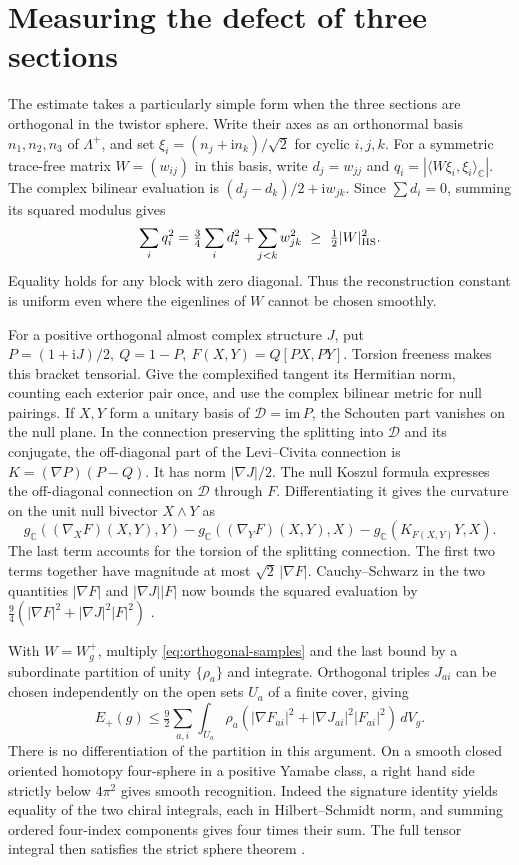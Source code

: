\documentclass[11pt]{article}
\numberwithin{equation}{section}
\begin{document}
\section{Measuring the defect of three sections}\label{sec:three-defects}

The estimate takes a particularly simple form when the three sections
are orthogonal in the twistor sphere. Write their axes as an orthonormal
basis \(n_1,n_2,n_3\) of \(\Lambda^+\), and set
\(\xi_i=(n_j+\mathrm i n_k)/\sqrt2\) for cyclic \(i,j,k\).
For a symmetric trace-free matrix \(W=(w_{ij})\) in this basis, write
\(d_j=w_{jj}\) and \(q_i=|\langle W\xi_i,\xi_i\rangle_{\mathbb C}|\).
The complex bilinear evaluation is \((d_j-d_k)/2+\mathrm i w_{jk}\).
Since \(\sum d_i=0\), summing its squared modulus gives
\begin{equation}\label{eq:orthogonal-samples}
 \sum_i q_i^2=\tfrac34\sum_i d_i^2+\sum_{j<k}w_{jk}^2
 \ \ge\ \tfrac12|W|_{\rm HS}^2 .
\end{equation}
Equality holds for any block with zero diagonal. Thus the reconstruction
constant is uniform even where the eigenlines of \(W\) cannot be chosen
smoothly.

For a positive orthogonal almost complex structure \(J\), put
\(P=(1+\mathrm iJ)/2,\ Q=1-P,\ F(X,Y)=Q[PX,PY]\). Torsion freeness
makes this bracket tensorial. Give the complexified tangent its
Hermitian norm, counting each exterior pair once, and use the complex
bilinear metric for null pairings. If \(X,Y\) form a unitary basis of
\(\mathcal D=\mathrm{im}\,P\), the Schouten part vanishes on the null
plane. In the connection preserving the splitting into \(\mathcal D\)
and its conjugate, the off-diagonal part of the Levi--Civita connection is
\(K=(\nabla P)(P-Q)\). It has norm \(|\nabla J|/2\). The null Koszul
formula expresses the off-diagonal connection on \(\mathcal D\) through
\(F\). Differentiating it gives the curvature on the unit null bivector
\(X\wedge Y\) as
\[
 g_{\mathbb C}((\nabla_X F)(X,Y),Y)
 -g_{\mathbb C}((\nabla_Y F)(X,Y),X)
 -g_{\mathbb C}(K_{F(X,Y)}Y,X).
\]
The last term accounts for the torsion of the splitting connection.
The first two terms together have magnitude at most
\(\sqrt2\,|\nabla F|\). Cauchy--Schwarz in the two quantities
\(|\nabla F|\) and \(|\nabla J||F|\) now bounds the squared evaluation
by \(\tfrac94(|\nabla F|^2+|\nabla J|^2|F|^2)\)
\cite{Baker2026TwistorSections}.

With \(W=W_g^+\), multiply \eqref{eq:orthogonal-samples} and the
last bound by a subordinate partition of unity \(\{\rho_a\}\) and
integrate. Orthogonal triples \(J_{ai}\) can be chosen independently
on the open sets \(U_a\) of a finite cover, giving
\[
 E_+(g)\le\tfrac92\sum_{a,i}\int_{U_a}\rho_a
  (|\nabla F_{ai}|^2+|\nabla J_{ai}|^2|F_{ai}|^2)\,dV_g .
\]
There is no differentiation of the partition in this argument. On a
smooth closed oriented homotopy four-sphere in a positive Yamabe class,
a right hand side strictly below \(4\pi^2\) gives smooth recognition.
Indeed the signature identity yields equality of the two chiral
integrals, each in Hilbert--Schmidt norm, and summing ordered
four-index components gives four times their sum. The full tensor
integral then satisfies the strict sphere theorem
\cite[Theorem~A and Remark~2]{ChangGurskyYang2003}.
\end{document}
